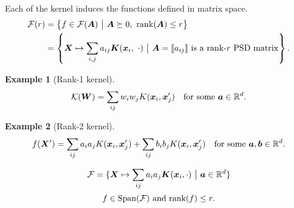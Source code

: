\documentclass[12pt]{article}
\newtheorem{example}{Example}
\begin{document}
\begin{comment}
\begin{alignat}{4}
&\mathbb{R}^{d\times d}\stackrel{\text{feature mapping}}{\longrightarrow} &&\tH^d \stackrel{\text{low-rank projection}}{\longrightarrow}& &\tH^r \stackrel{\text{linear function}}{\longrightarrow} &\mathbb{R}
\\
&\mX\mapsto &&\Phi(\mX) \mapsto&&\Phi(\mX)\mP \mapsto &&\langle \mW, \Phi(\mX)\mP\rangle_{\tH^r}
\end{alignat}
Equivalently, define a family of kernels induced by a given $K$. 
\[
\tF(r)=\left\{ (\mX,\mX')\mapsto \sum_{i,j}a_{ij}K(\mx_i,\mx'_j)\ \big| \ \mA=\entry{a_{ij}} \succeq 0,\ \text{rank}(\mA)\leq r \right\}.
\]
Given a classical kernel $\mK$. Define a positive semi-definite matrix $\mA=\entry{a_{ij}}$, define a kernel in matrix space:
\begin{align}
\tA \colon \mathbb{R}^{d\times d} \times \mathbb{R}^{d\times d} & \to \mathbb{R}\\
(\mX,\mX')&\mapsto \sum_{i,j}a_{ij}K(\mx_i, \mx'_j).
\end{align}
Then $\tA$ is a value kernel defined in matrix space. Now let $\tF(\mA)$ denote the RKHS generated from $\mA$. 
\[
\tF(\mA)=\left\{\mX\mapsto \sum_{ij}a_{ij}\mK(\mx_i,\cdot)\ \big| \ \mX\in\mathbb{R}^{d\times d}\right\}
\]
\end{comment}

Each of the kernel induces the functions defined in matrix space. 
\begin{align}
\tF(r)&=\left\{ f\in\tF(\mA) \ \big| \ \mA  \succeq 0, \ \text{rank}(\mA)\leq r\right\} \\
&=\left\{ \mX\mapsto \sum_{i,j}a_{ij}\mK(\mx_i,\ \cdot) \ \big|  \ \mA=\entry{a_{ij}} \text{ is a rank-$r$ PSD matrix} \right\}.
\end{align}

\begin{example}[Rank-1 kernel] 
\[
\mathcal{K}(\bm{W})=\sum_{ij}w_iw_jK(\bm x_i,\bm x'_j) \quad \text{for some }\bm{a}\in\mathbb{R}^d. 
\]
\end{example}

\begin{example}[Rank-2 kernel]
\[
f(\bm X')=\sum_{ij}a_ia_jK(\bm x_i,\bm x'_j) + \sum_{ij}b_ib_jK(\bm x_i,\bm x'_j) \quad \text{for some } \bm{a},\bm{b}\in\mathbb{R}^d.
\]
\end{example}

\[
\mathcal{F}=\{\bm X\mapsto \sum_{ij}a_ia_j\bm K(\bm x_i,\cdot)\ \big| \ \bm{a}\in\mathbb{R}^d\}
\]
\[
f\in \text{Span}(\tF) \ \text{and} \ \text{rank}(f)\leq r. 
\]
\end{document}
